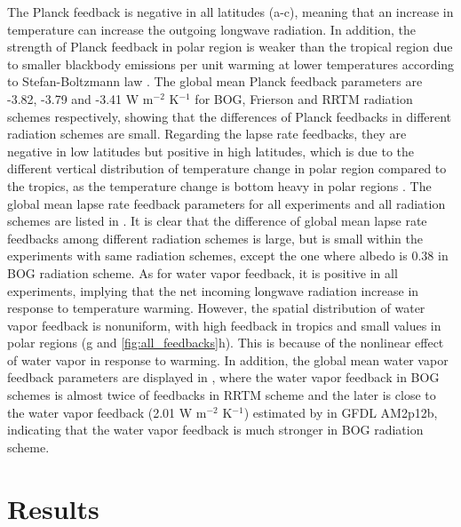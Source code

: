 The Planck feedback  is negative in all latitudes (a-c), meaning that an increase in temperature can increase the outgoing longwave radiation. In addition, the strength of Planck feedback in polar region is weaker than the tropical region due to smaller blackbody emissions per unit warming at lower temperatures according to Stefan-Boltzmann law \citep{Goosse2018}. The global mean Planck feedback parameters are -3.82, -3.79 and -3.41 W m$^{-2}$ K$^{-1}$ for BOG, Frierson and RRTM radiation schemes respectively, showing that the differences of Planck feedbacks in different radiation schemes are small. Regarding the lapse rate feedbacks, they are negative in low latitudes but positive in high latitudes, which is due to the different vertical distribution of temperature change in polar region compared to the tropics, as the temperature change is bottom heavy in polar regions \citep{Pithan2014}. The global mean lapse rate feedback parameters for all experiments and all radiation schemes are listed in . It is clear that the difference of global mean lapse rate feedbacks among different radiation schemes is large, but is small within the experiments with same radiation schemes, except the one where albedo is 0.38 in BOG radiation scheme. As for water vapor feedback, it is positive in all experiments, implying that the net incoming longwave radiation increase in response to temperature warming. However, the spatial distribution of water vapor feedback is nonuniform, with high feedback in tropics and small values in polar regions (g and \ref{fig:all_feedbacks}h). This is because of the nonlinear effect of water vapor in response to warming. In addition, the global mean water vapor feedback parameters are displayed in , where the water vapor feedback in BOG schemes is almost twice of feedbacks in RRTM scheme and the later is close to the water vapor feedback (2.01 W m$^{-2}$ K$^{-1}$) estimated by \cite{Soden2008} in GFDL AM2p12b, indicating that the water vapor feedback is much stronger in BOG radiation scheme.


\section{Results}
\label{sec:polar_amiplification_results}


